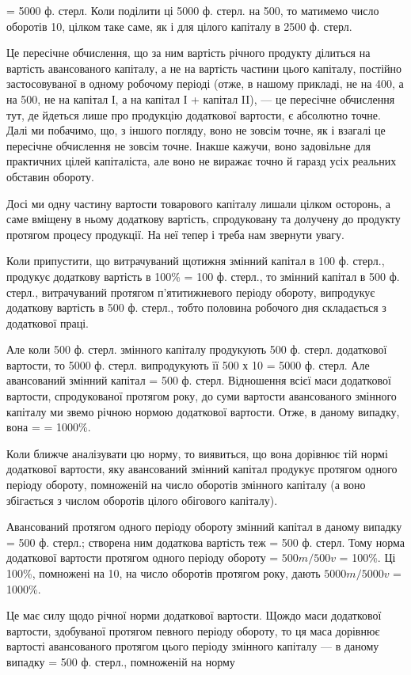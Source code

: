 \parcont{}  %
 = 5000 ф. стерл. Коли поділити ці 5000 ф. стерл. на 500, то матимемо число оборотів 10,
цілком таке саме, як і для цілого капіталу в 2500 ф. стерл.

Це пересічне обчислення, що за ним вартість річного продукту ділиться на вартість авансованого
капіталу, а не на вартість частини цього капіталу, постійно застосовуваної в одному робочому періоді
(отже, в нашому прикладі, не на 400, а на 500, не на капітал І, а на капітал І + капітал II), — це
пересічне обчислення тут, де йдеться лише про продукцію додаткової вартости, є абсолютно точне. Далі
ми побачимо, що, з іншого погляду, воно не зовсім точне, як і взагалі це пересічне обчислення не
зовсім точне. Інакше кажучи, воно задовільне для практичних цілей капіталіста,
але воно не виражає точно й гаразд усіх реальних обставин обороту.

Досі ми одну частину вартости товарового капіталу лишали цілком осторонь, а саме вміщену в ньому
додаткову вартість, спродуковану та долучену до продукту протягом процесу продукції. На неї тепер і
треба нам звернути увагу.

Коли припустити, що витрачуваний щотижня змінний капітал в 100 ф. стерл., продукує додаткову
вартість в 100\% = 100 ф. стерл., то змінний капітал в 500 ф. стерл.,  витрачуваний протягом
п’ятитижневого періоду обороту, випродукує додаткову вартість в 500 ф. стерл., тобто половина
робочого дня складається з додаткової праці.

Але коли 500 ф. стерл. змінного капіталу продукують 500 ф. стерл. додаткової вартости, то 5000 ф.
стерл. випродукують її 500 х 10 = 5000 ф. стерл. Але авансований змінний капітал = 500 ф. стерл.
Відношення всієї маси додаткової вартости, спродукованої протягом року, до суми вартости
авансованого змінного капіталу ми звемо річною нормою додаткової вартости. Отже, в даному випадку,
вона =  = 1000\%.

Коли ближче аналізувати цю норму, то виявиться, що вона дорівнює тій нормі додаткової вартости, яку
авансований змінний капітал продукує протягом одного періоду обороту, помноженій на число оборотів
змінного капіталу (а воно збігається з числом оборотів цілого обігового капіталу).

Авансований протягом одного періоду обороту змінний капітал в даному випадку = 500 ф. стерл.;
створена ним додаткова вартість теж = 500 ф. стерл. Тому норма додаткової вартости протягом одного
періоду обороту = $500 m / 500 v$ = 100\%. Ці 100\%, помножені на 10, на число оборотів протягом року,
дають $5000 m / 5000 v$ = 1000\%.

Це має силу щодо річної норми додаткової вартости. Щождо маси додаткової вартости, здобуваної
протягом певного періоду обороту, то ця маса дорівнює вартості авансованого протягом цього періоду
змінного капіталу — в даному випадку = 500 ф. стерл., помноженій на норму
\parbreak{}  %

